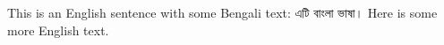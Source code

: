 \documentclass{article}
\begin{document}
This is an English sentence with some Bengali text: \textbengali{এটি বাংলা ভাষা।} Here is some more English text.
\end{document}
